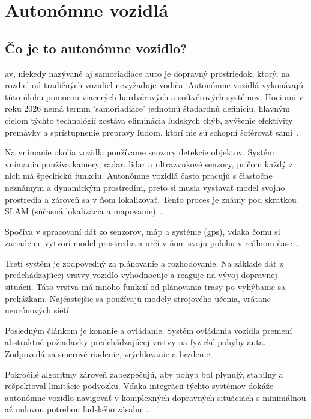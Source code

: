 \section{Autonómne vozidlá}\label{sec:AutonomneVozidla}
\subsection{Čo je to autonómne vozidlo?}\par
\acrfull{av}, niekedy nazývané aj samoriadiace auto je dopravný prostriedok, ktorý, na rozdiel od tradičných vozidiel nevyžaduje vodiča. Autonómne vozidlá vykonávajú túto úlohu pomocou viacerých hardvérových a softvérových systémov. Hoci ani v roku 2026 nemá termín 'samoriadiace' jednotnú štadardnú definíciu, hlavným cieľom týchto technológií zostáva eliminácia ľudských chýb, zvýšenie efektivity premávky a sprístupnenie prepravy ľudom, ktorí nie sú schopní šoférovať sami~\cite{wevolver2020}.\par
Na vnímanie okolia vozidla používame senzory detekcie objektov. Systém vnímania používa kamery, \acrfull{radar}, \acrfull{lidar} a ultrazvukové senzory, pričom každý z nich má špecifickú funkciu. Autonómne vozidlá často pracujú s čiastočne neznámym a dynamickým prostredím, preto si musia vystavať model svojho prostredia a zároveň sa v ňom lokalizovať. Tento proces je známy pod skratkou SLAM (súčasná lokalizácia a mapovanie)~\cite{wevolver2020}.\par
Spočíva v spracovaní dát zo senzorov, máp a systéme  (\acrshort{gps}), vďaka čomu si zariadenie vytvorí model prostredia a určí v ňom svoju polohu v reálnom čase~\cite{wevolver2020}.\par
Tretí systém je zodpovedný za plánovanie a rozhodovanie. Na základe dát z predchádzajúcej vrstvy vozidlo vyhodnocuje a reaguje na vývoj dopravnej situácii. Táto vrstva má mnoho funkcií od plánovania trasy po vyhýbanie sa prekážkam. Najčastejšie sa používajú modely strojového učenia, vrátane neurónových sietí~\cite{wevolver2020}.\par
Posledným článkom je konanie a ovládanie. Systém ovládania vozidla premení abstraktné požiadavky predchádzajúcej vrstvy na fyzické pohyby auta. Zodpovedá za smerové riadenie, zrýchľovanie a brzdenie.\par
Pokročilé algoritmy zároveň zabezpečujú, aby pohyb bol plynulý, stabilný a rešpektoval limitácie podvozku. Vďaka integrácii týchto systémov dokáže autonómne vozidlo navigovať v komplexných dopravných situáciách s minimálnou až nulovou potrebou ľudského zásahu~\cite{wevolver2020}.
